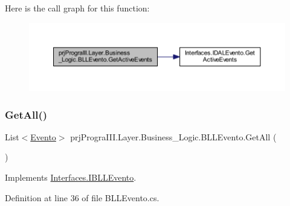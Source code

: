 Here is the call graph for this function\+:
\nopagebreak
\begin{figure}[H]
\begin{center}
\leavevmode
\includegraphics[width=350pt]{classprj_progra_i_i_i_1_1_layer_1_1_business___logic_1_1_b_l_l_evento_a72838525485eaff7c98c698dac7e5f71_cgraph}
\end{center}
\end{figure}
\hypertarget{classprj_progra_i_i_i_1_1_layer_1_1_business___logic_1_1_b_l_l_evento_a5b9114ece4753c247a3ad365ca543da2}{}\label{classprj_progra_i_i_i_1_1_layer_1_1_business___logic_1_1_b_l_l_evento_a5b9114ece4753c247a3ad365ca543da2} 
\subsubsection{\texorpdfstring{Get\+All()}{GetAll()}}
{\footnotesize\ttfamily List$<$\hyperlink{classprj_progra_i_i_i_1_1_layer_1_1_entities_1_1_evento}{Evento}$>$ prj\+Progra\+I\+I\+I.\+Layer.\+Business\+\_\+\+Logic.\+B\+L\+L\+Evento.\+Get\+All (\begin{DoxyParamCaption}{ }\end{DoxyParamCaption})}



Implements \hyperlink{interface_interfaces_1_1_i_b_l_l_evento_a2573cdfaf0097cfcf185b39ddaede2d8}{Interfaces.\+I\+B\+L\+L\+Evento}.



Definition at line 36 of file B\+L\+L\+Evento.\+cs.

